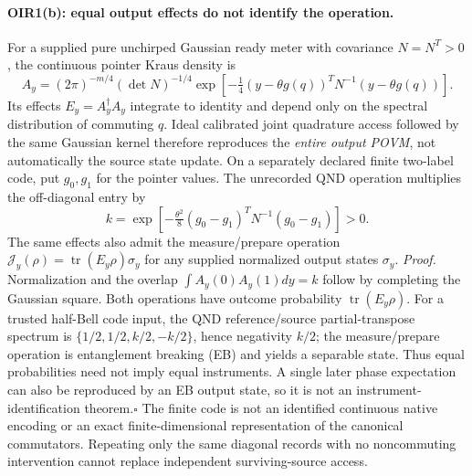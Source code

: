 \documentclass[11pt]{article}
\begin{document}
\paragraph{OIR1(b): equal output effects do not identify the operation.}
For a supplied pure unchirped Gaussian ready meter with covariance $N=N^T>0$,
the continuous pointer Kraus density is
\[
 A_y=(2\pi)^{-m/4}(\det N)^{-1/4}
 \exp[-\tfrac14(y-\theta g(q))^TN^{-1}(y-\theta g(q))].
\]
Its effects $E_y=A_y^\dagger A_y$ integrate to identity and depend only
on the spectral distribution of commuting $q$. Ideal calibrated joint
quadrature access followed by the same Gaussian kernel therefore reproduces
the \emph{entire output POVM}, not automatically the source state update.
On a separately declared finite two-label code, put $g_0,g_1$ for the pointer
values. The unrecorded QND operation multiplies the off-diagonal entry by
\[
 k=\exp[-\tfrac{\theta^2}{8}
               (g_0-g_1)^TN^{-1}(g_0-g_1)]>0.                \tag{OIR1b}
\]
The same effects also admit the measure/prepare operation
$\mathcal J_y(\rho)=\operatorname{tr}(E_y\rho)\sigma_y$ for any supplied
normalized output states $\sigma_y$.
\emph{Proof.} Normalization and the overlap $\int A_y(0)A_y(1)dy=k$
follow by completing the Gaussian square. Both operations have outcome
probability $\operatorname{tr}(E_y\rho)$. For a trusted half-Bell code input,
the QND reference/source partial-transpose spectrum is
$\{1/2,1/2,k/2,-k/2\}$, hence negativity $k/2$; the measure/prepare
operation is entanglement breaking (EB) and yields a separable state.
Thus equal probabilities need not imply equal instruments. A single later
phase expectation can also be reproduced by an EB output state, so it is
not an instrument-identification theorem.\hfill$\square$
The finite code is not an identified continuous native encoding or an exact
finite-dimensional representation of the canonical commutators. Repeating
only the same diagonal records with no noncommuting intervention cannot
replace independent surviving-source access.
\end{document}
